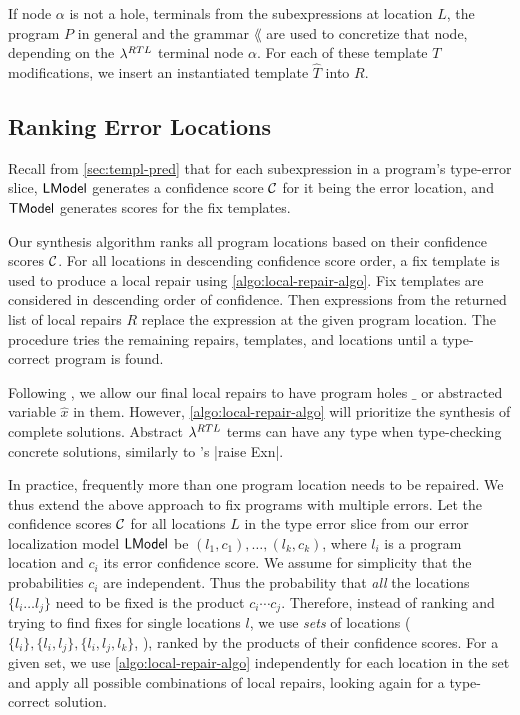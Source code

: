If node $\alpha$ is not a hole, terminals from the subexpressions at location
$L$, the program $P$ in general and the grammar $\lang$ are used to concretize
that node, depending on the $\lambda^{RTL}$ terminal node $\alpha$. For each of
these template $T$ modifications, we insert an instantiated template $\hat{T}$
into $R$.

\subsection{Ranking Error Locations}
\label{sec:synthesis:location-rank}

Recall from \autoref{sec:templ-pred} that for each subexpression in a program's
type-error slice, $\mathsf{LModel}$ generates a confidence score $\mathcal{C}$ for it being the
error location, and $\mathsf{TModel}$ generates scores for the fix templates.

Our synthesis algorithm ranks all program locations based on their confidence
scores $\mathcal{C}$. For all locations in descending confidence score order, a fix
template is used to produce a local repair using
\autoref{algo:local-repair-algo}. Fix templates are considered in descending
order of confidence. Then expressions from the returned list of local repairs
$R$ replace the expression at the given program location. The procedure tries
the remaining repairs, templates, and locations until a type-correct program is
found.

Following \citep{Lerner2007-dt}, we allow our final local repairs to have
program holes $\_$ or abstracted variable $\hat{x}$ in them. However,
\autoref{algo:local-repair-algo} will prioritize the synthesis of complete
solutions. Abstract $\lambda^{RTL}$ terms can have any
type when type-checking concrete solutions, similarly to \ocaml's |raise Exn|.

In practice, frequently more than one program location needs to be repaired. We
thus extend the above approach to fix programs with multiple errors. Let the
confidence scores $\mathcal{C}$ for all locations $L$ in the type error slice from our
error localization model $\mathsf{LModel}$ be $(l_1, c_1), \dots, (l_k, c_k)$, where
$l_i$ is a program location and $c_i$ its error confidence score. We assume for
simplicity that the probabilities $c_i$ are independent. Thus the probability
that \emph{all} the locations $\{l_i \dots l_j\}$ need to be fixed is the
product $c_i \cdots c_j$. Therefore, instead of ranking and trying to find fixes
for single locations $l$, we use \emph{sets} of locations ($\{l_i\}, \{l_i,
l_j\}, \{l_i, l_j, l_k\}$, \etc), ranked by the products of their confidence
scores. For a given set, we use \autoref{algo:local-repair-algo} independently
for each location in the set and apply all possible combinations of local
repairs, looking again for a type-correct solution.

\lstDeleteShortInline{|}
